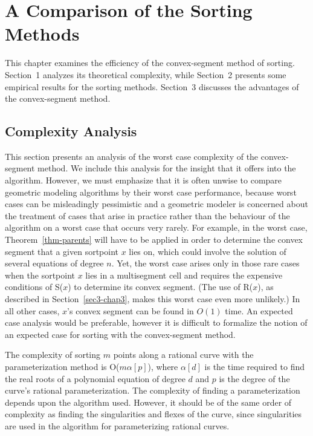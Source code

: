 \chapter{A Comparison of the Sorting Methods}
\label{chap-results}

This chapter examines the efficiency of the convex-segment method
of sorting.
Section~1 analyzes its theoretical complexity, while
Section~2 presents some empirical results for the sorting methods.
Section~3 discusses the advantages of the 
convex-segment method.

\section{Complexity Analysis}

This section presents an analysis of the worst case complexity of 
the convex-segment method.
We include this analysis for the insight that it offers into the algorithm.
However, we must emphasize that it is often unwise to compare
geometric modeling algorithms by their worst case performance,
because worst cases can be misleadingly pessimistic and
a geometric modeler is concerned about the 
treatment of cases that arise in practice rather than the behaviour of the
algorithm on a worst case that occurs very rarely.
For example, in the worst case, Theorem~\ref{thm-parents} will have to be 
applied in order to determine the convex segment that a given sortpoint $x$
lies on, which could involve the solution of several equations of degree $n$.
Yet, the worst case arises only in those rare cases when the sortpoint $x$ 
lies in a multisegment cell and requires the expensive conditions of S($x$)
to determine its convex segment.
(The use of R($x$), as described in Section~\ref{sec3-chap3}, makes this
worst case even more unlikely.)
In all other cases, $x$'s convex segment can be found in $O(1)$ time.
An expected case analysis would be preferable, however it is difficult to
formalize the notion of an expected case for sorting with the convex-segment
method.

The complexity of sorting $m$ points along a rational curve 
with the parameterization method is O($m\alpha[p]$), where $\alpha[d]$ is 
the time required to find the real roots of a polynomial equation of degree
$d$ and $p$ is the degree of the curve's rational parameterization.
The complexity of finding a parameterization depends upon the algorithm used.
However, it should be of the same order of complexity as finding the 
singularities and flexes of the curve, since singularities are 
used in the algorithm for parameterizing rational curves.

